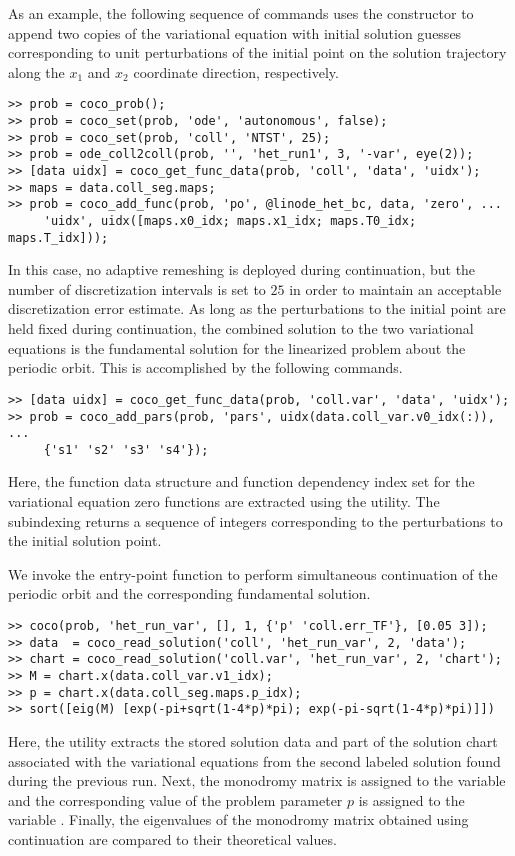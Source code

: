 As an example, the following sequence of commands uses the  constructor to append two copies of the variational equation with initial solution guesses corresponding to unit perturbations of the initial point on the solution trajectory along the $x_1$ and $x_2$ coordinate direction, respectively. 
\begin{lstlisting}[language=coco-highlight]
>> prob = coco_prob();
>> prob = coco_set(prob, 'ode', 'autonomous', false);
>> prob = coco_set(prob, 'coll', 'NTST', 25);
>> prob = ode_coll2coll(prob, '', 'het_run1', 3, '-var', eye(2));
>> [data uidx] = coco_get_func_data(prob, 'coll', 'data', 'uidx');
>> maps = data.coll_seg.maps;
>> prob = coco_add_func(prob, 'po', @linode_het_bc, data, 'zero', ...
     'uidx', uidx([maps.x0_idx; maps.x1_idx; maps.T0_idx; maps.T_idx]));
\end{lstlisting}
In this case, no adaptive remeshing is deployed during continuation, but the number of discretization intervals is set to $25$ in order to maintain an acceptable discretization error estimate. As long as the perturbations to the initial point are held fixed during continuation, the combined solution to the two variational equations is the fundamental solution for the linearized problem about the periodic orbit. This is accomplished by the following commands.
\begin{lstlisting}[language=coco-highlight]
>> [data uidx] = coco_get_func_data(prob, 'coll.var', 'data', 'uidx');
>> prob = coco_add_pars(prob, 'pars', uidx(data.coll_var.v0_idx(:)), ...
     {'s1' 's2' 's3' 's4'});
\end{lstlisting}
Here, the function data structure and function dependency index set for the variational equation zero functions are extracted using the  utility. The subindexing  returns a sequence of integers corresponding to the perturbations to the initial solution point.

We invoke the  entry-point function to perform simultaneous continuation of the periodic orbit and the corresponding fundamental solution.
\begin{lstlisting}[language=coco-highlight]
>> coco(prob, 'het_run_var', [], 1, {'p' 'coll.err_TF'}, [0.05 3]);
>> data  = coco_read_solution('coll', 'het_run_var', 2, 'data');
>> chart = coco_read_solution('coll.var', 'het_run_var', 2, 'chart');
>> M = chart.x(data.coll_var.v1_idx);
>> p = chart.x(data.coll_seg.maps.p_idx);
>> sort([eig(M) [exp(-pi+sqrt(1-4*p)*pi); exp(-pi-sqrt(1-4*p)*pi)]])
\end{lstlisting}
Here, the  utility extracts the stored solution data and part of the solution chart associated with the variational equations from the second labeled solution found during the previous run.  Next, the monodromy matrix is assigned to the variable  and the corresponding value of the problem parameter $p$ is assigned to the variable . Finally, the eigenvalues of the monodromy matrix obtained using continuation are compared to their theoretical values.\\
\medskip

